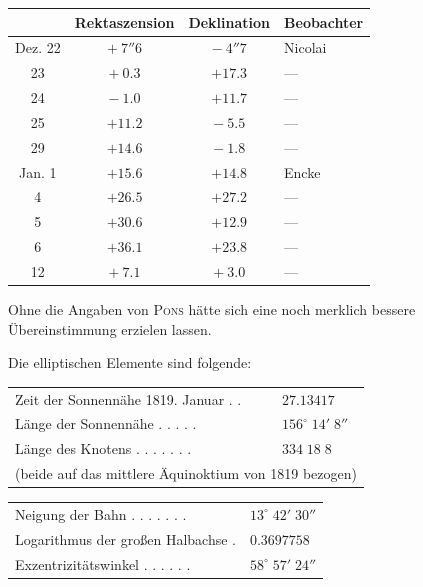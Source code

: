 \begin{center}
\begin{tabular}{c|c|c|l}
& Rektaszension & Deklination & Beobachter \\
\hline
Dez. 22 & $+\ 7''6$  & $-\ 4''7$  & Nicolai \\
     23 & $+\ 0.3$   & $+17.3$    & --- \\
     24 & $-\ 1.0$   & $+11.7$    & --- \\
     25 & $+11.2$    & $-\ 5.5$   & --- \\
     29 & $+14.6$    & $-\ 1.8$   & --- \\
Jan.  1 & $+15.6$    & $+14.8$    & Encke \\
      4 & $+26.5$    & $+27.2$    & --- \\
      5 & $+30.6$    & $+12.9$    & --- \\
      6 & $+36.1$    & $+23.8$    & --- \\
     12 & $+\ 7.1$   & $+\ 3.0$   & --- \\
\end{tabular}
\end{center}

\par\indent Ohne die Angaben von \textsc{Pons} hätte sich eine noch merklich bessere Übereinstimmung erzielen lassen.

\par\indent Die elliptischen Elemente sind folgende:

\begin{center}
\begin{tabular}{ll}
Zeit der Sonnennähe 1819. Januar . . & $27.13417$\footnotemark \\
Länge der Sonnennähe . . . . . & $156^\circ\;14'\;8''$ \\
Länge des Knotens . . . . . . . & $334\;18\;8$ \\
\multicolumn{2}{l}{(beide auf das mittlere Äquinoktium von 1819 bezogen)} \\
\end{tabular}\par\smallskip
\begin{tabular}{ll}
Neigung der Bahn . . . . . . . & $13^\circ\;42'\;30''$ \\
Logarithmus der großen Halbachse . & $0.3697758$ \\
Exzentrizitätswinkel . . . . . . & $58^\circ\;57'\;24''$ \\
\end{tabular}
\end{center}

